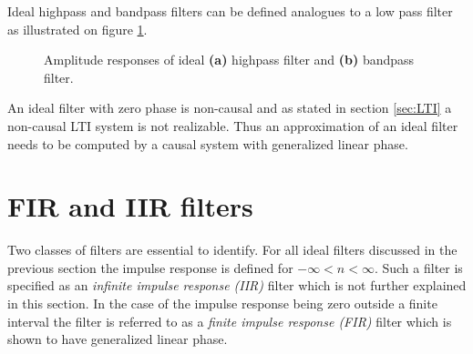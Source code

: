 Ideal highpass and bandpass filters can be defined analogues to a low pass filter as illustrated on figure \ref{fig:ideal}.
\begin{figure}[H]
\begin{subfigure}[b]{0.50\textwidth}
        \centering
{}

\caption{}
    \end{subfigure}
 \begin{subfigure}[b]{0.50\textwidth}
        \centering  
{}
\caption{}
    \end{subfigure}
\caption{Amplitude responses of ideal \textbf{(a)} highpass filter and \textbf{(b)} bandpass filter.}
\label{fig:ideal}
\end{figure}
An ideal filter with zero phase is non-causal and as stated in section \ref{sec:LTI} a non-causal LTI system is not realizable. Thus an approximation of an ideal filter needs to be computed by a causal system with generalized linear phase.

\section{FIR and IIR filters} \label{sec:FIR_IIR}
Two classes of filters are essential to identify. For all ideal filters discussed in the previous section the impulse response is defined for $-\infty < n < \infty$. Such a filter is specified as an \textit{infinite impulse response (IIR)} filter which is not further explained in this section. In the case of the impulse response being zero outside a finite interval the filter is referred to as a \textit{finite impulse response (FIR)} filter which is shown to have generalized linear phase.

